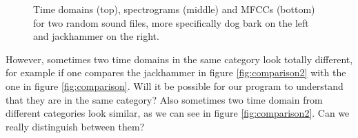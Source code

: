 \begin{figure} [H]%
	\centering
	
	\caption{Time domains (top), spectrograms (middle) and MFCCs (bottom) for two random sound files, more specifically dog bark on the left and jackhammer on the right.}%
	\label{fig:comparison}
\end{figure}
However, sometimes two time domains in the same category look totally different, for example if one compares the jackhammer in figure \eqref{fig:comparison2} with the one in figure \eqref{fig:comparison}. Will it be possible for our program to understand that they are in the same category? Also sometimes two time domain from different categories look similar, as we can see in figure \eqref{fig:comparison2}. Can we really distinguish between them?

